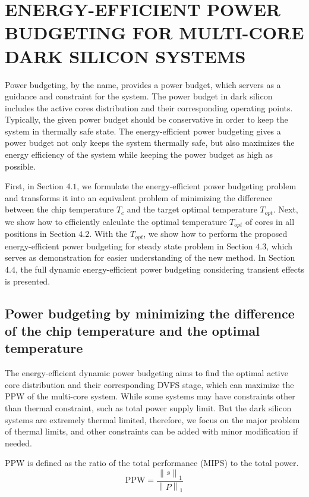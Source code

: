 \section{ENERGY-EFFICIENT POWER BUDGETING FOR MULTI-CORE DARK SILICON SYSTEMS}

Power budgeting, by the name, provides a power budget, which servers as a guidance and constraint for the system. The power budget in dark silicon includes the active cores distribution and their corresponding operating points. Typically, the given power budget should be conservative in order to keep the system in thermally safe state. The energy-efficient power budgeting gives a power budget not only keeps the system thermally safe, but also maximizes the energy efficiency of the system while keeping the power budget as high as possible. 

First, in Section $4.1$, we formulate the energy-efficient power budgeting problem and transforms it into an equivalent problem of minimizing the difference between the chip temperature $T_{c}$ and the target optimal temperature $T_{opt}$. Next, we show how to efficiently calculate the optimal temperature $T_{opt}$ of cores in all positions in Section $4.2$. With the $T_{opt}$, we show how to perform the proposed energy-efficient power budgeting for steady state problem in Section $4.3$, which serves as demonstration for easier understanding of the new method. In Section $4.4$, the full dynamic energy-efficient power budgeting considering transient effects is presented.

\subsection{Power budgeting by minimizing the difference of the chip temperature and the optimal temperature}
The energy-efficient dynamic power budgeting aims to find the optimal active core distribution and their corresponding DVFS stage, which can maximize the PPW of the multi-core system. While some systems may have constraints other than thermal constraint, such as total power supply limit. But the dark silicon systems are extremely thermal limited, therefore, we focus on the major problem of thermal limits, and other constraints can be added with minor modification if needed.

PPW is defined as the ratio of the total performance (MIPS) to the total power.
\begin{equation}\label{eq:ppw}
\text{PPW} = \frac{\left \| s \right \|_{1}}{\left \| P \right \|_{1}}
\end{equation}

